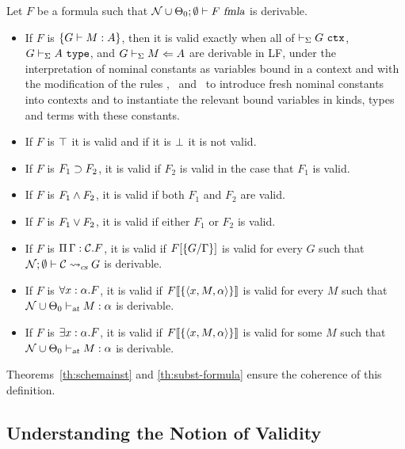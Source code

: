 \begin{definition}\label{def:semantics}
Let $F$ be a formula such that $\wfform{\noms \cup
  \STLCGamma_0}{\emptyset}{F}$ is derivable. 
%
\begin{itemize}
\item If $F$ is $\fatm{G}{M:A}$, then it is valid exactly when all of $\lfctx{G}$,
  $\lftype{G}{A}$, and $\lfchecktype{G}{M}{A}$ are derivable in LF,
  under the interpretation of nominal constants as variables bound in
  a context and with the modification of the rules \canonkindpi, \canonfampi\ and
  \canontermlam\ to introduce fresh nominal constants into contexts and to
  instantiate the relevant bound variables in kinds, types and terms with
  these constants.

\item If $F$ is $\ftrue$ it is valid and if it is $\ffalse$ it is not valid.

\item If $F$ is $\fimp{F_1}{F_2}$, it is valid if $F_2$ is valid in
  the case that $F_1$ is valid.

\item If $F$ is $\fand{F_1}{F_2}$, it is valid if both $F_1$ and
  $F_2$ are valid.

\item If $F$ is $\myfor{F_1}{F_2}$, it is valid if either $F_1$ or $F_2$ is valid.

\item If $F$ is $\fctx{\Gamma}{\mathcal{C}}{F}$, it is valid if
  $\subst{\{G/\Gamma\}}{F}$ is valid for every $G$ such that
  $\csinst{\noms}{\emptyset}{\mathcal{C}}{G}$ is derivable.

\item If $F$ is $\fall{x:\alpha}{F}$, it is valid if
  $\hsubst{\{\langle x, M,\alpha\rangle \}}{F}$ is valid for every $M$ such that
  $\stlctyjudg{\noms \cup \STLCGamma_0}{M}{\alpha}$ is derivable.

\item If $F$ is $\fexists{x:\alpha}{F}$, it is valid if
  $\hsubst{\{\langle x, M,\alpha\rangle \}}{F}$ is valid for some $M$ such that 
  $\stlctyjudg{\noms \cup \STLCGamma_0}{M}{\alpha}$ is derivable.
\end{itemize}
Theorems~\ref{th:schemainst} and \ref{th:subst-formula} ensure the
coherence of this definition. 
\end{definition}

\subsection{Understanding the Notion of Validity}\label{ssec:logic-examples}

